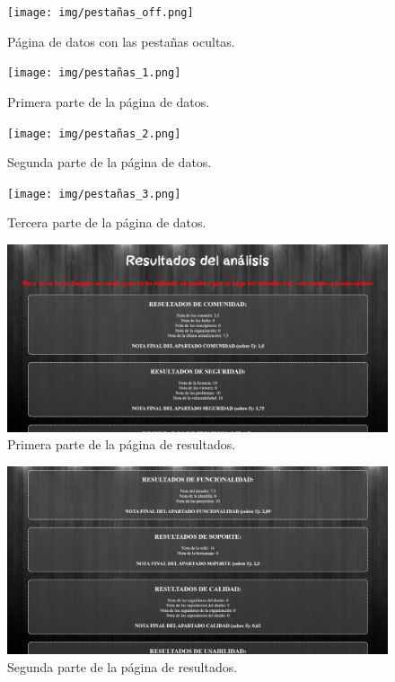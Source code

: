 \documentclass[a4paper, 12pt]{book}
\begin{document}
\begin{figure}
    
    \texttt{[image: img/pestañas\_off.png]}
    \caption{Página de datos con las pestañas ocultas.}\label{fig:pestañas_off}
\end{figure}
\begin{figure}
    
    \texttt{[image: img/pestañas\_1.png]}
    \caption{Primera parte de la página de datos.}\label{fig:pestañas_1}
\end{figure}
\begin{figure}
    
    \texttt{[image: img/pestañas\_2.png]}
    \caption{Segunda parte de la página de datos.}\label{fig:pestañas_2}
\end{figure}
\begin{figure}
    
    \texttt{[image: img/pestañas\_3.png]}
    \caption{Tercera parte de la página de datos.}\label{fig:pestañas_3}
\end{figure}
\begin{figure}
    
    \includegraphics[bb=0 0 800 600, width=12cm, keepaspectratio]{img/resultados_1.png}
    \caption{Primera parte de la página de resultados.}\label{fig:resultados_1}
\end{figure}
\begin{figure}
    
    \includegraphics[bb=0 0 800 600, width=12cm, keepaspectratio]{img/resultados_2.png}
    \caption{Segunda parte de la página de resultados.}\label{fig:resultados_2}
\end{figure}
\end{document}

